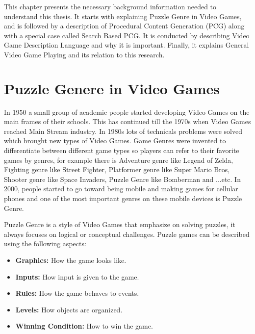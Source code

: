 This chapter presents the necessary background information needed to understand this thesis. It starts with explaining Puzzle Genre in Video Games, and is followed by a description of Procedural Content Generation (PCG) along with a special case called Search Based PCG. It is conducted by describing Video Game Description Language and why it is important. Finally, it explains General Video Game Playing and its relation to this research.

\section{Puzzle Genere in Video Games}
In 1950 a small group of academic people started developing Video Games on the main frames of their schools. This has continued till the 1970s when Video Games reached Main Stream industry. In 1980s lots of technicals problems were solved which brought new types of Video Games. Game Genres were invented to differentiate between different game types so players can refer to their favorite games by genres, for example there is Adventure genre like Legend of Zelda, Fighting genre like Street Fighter, Platformer genre like Super Mario Bros, Shooter genre like Space Invaders, Puzzle Genre like Bomberman and ...etc. In 2000, people started to go toward being mobile and making games for cellular  phones and one of the most important genres on these mobile devices is Puzzle Genre\cite{pcgHistory}.\\\par

Puzzle Genre is a style of Video Games that emphasize on solving puzzles, it always focuses on logical or conceptual challenges. Puzzle games can be described using the following aspects:
\begin{itemize} \itemsep0pt \parskip0pt 
	\item \textbf{Graphics:} How the game looks like.
  	\item \textbf{Inputs:} How input is given to the game.
  	\item \textbf{Rules:} How the game behaves to events.
  	\item \textbf{Levels:} How objects are organized.
  	\item \textbf{Winning Condition:} How to win the game.
\end{itemize}

